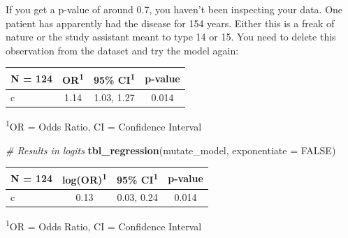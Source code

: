 \documentclass[]{book}
\newenvironment{Shaded}{\begin{snugshade}}{\end{snugshade}}
\newcommand{\CommentTok}[1]{\textcolor[rgb]{0.56,0.35,0.01}{\textit{#1}}}
\newcommand{\DataTypeTok}[1]{\textcolor[rgb]{0.13,0.29,0.53}{#1}}
\newcommand{\DecValTok}[1]{\textcolor[rgb]{0.00,0.00,0.81}{#1}}
\newcommand{\KeywordTok}[1]{\textcolor[rgb]{0.13,0.29,0.53}{\textbf{#1}}}
\newcommand{\NormalTok}[1]{#1}
\newcommand{\OperatorTok}[1]{\textcolor[rgb]{0.81,0.36,0.00}{\textbf{#1}}}
\newcommand{\OtherTok}[1]{\textcolor[rgb]{0.56,0.35,0.01}{#1}}
\newcommand{\StringTok}[1]{\textcolor[rgb]{0.31,0.60,0.02}{#1}}
\begin{document}
If you get a p-value of around 0.7, you haven't been inspecting your data. One patient has apparently had the disease for 154 years. Either this is a freak of nature or the study assistant meant to type 14 or 15. You need to delete this observation from the dataset and try the model again:

\begin{Shaded}
\end{Shaded}

\captionsetup[table]{labelformat=empty,skip=1pt}
\begin{longtable}{lccc}
\toprule
\textbf{N = 124} & \textbf{OR}\textsuperscript{1} & \textbf{95\% CI}\textsuperscript{1} & \textbf{p-value} \\ 
\midrule
c & 1.14 & 1.03, 1.27 & 0.014 \\ 
\bottomrule
\end{longtable}
\vspace{-5mm}
\begin{minipage}{\linewidth}
\textsuperscript{1}OR = Odds Ratio, CI = Confidence Interval \\ 
\end{minipage}

\begin{Shaded}
\begin{Highlighting}[]
\CommentTok{# Results in logits}
\KeywordTok{tbl_regression}\NormalTok{(mutate_model, }\DataTypeTok{exponentiate =} \OtherTok{FALSE}\NormalTok{)}
\end{Highlighting}
\end{Shaded}

\captionsetup[table]{labelformat=empty,skip=1pt}
\begin{longtable}{lccc}
\toprule
\textbf{N = 124} & \textbf{log(OR)}\textsuperscript{1} & \textbf{95\% CI}\textsuperscript{1} & \textbf{p-value} \\ 
\midrule
c & 0.13 & 0.03, 0.24 & 0.014 \\ 
\bottomrule
\end{longtable}
\vspace{-5mm}
\begin{minipage}{\linewidth}
\textsuperscript{1}OR = Odds Ratio, CI = Confidence Interval \\ 
\end{minipage}
\end{document}
